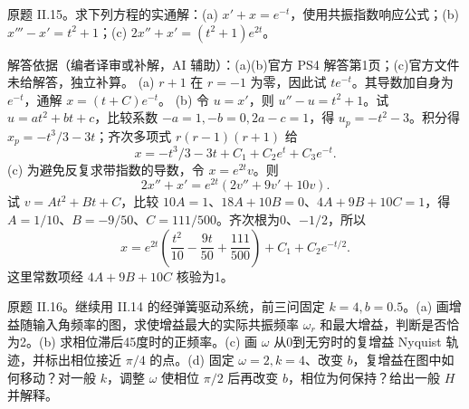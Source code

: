 \begin{exercise}\label{cw:ps4-II-15}
原题 II.15。求下列方程的实通解：(a) $x'+x=e^{-t}$，使用共振指数响应公式；(b) $x'''-x'=t^2+1$；(c) $2x''+x'=(t^2+1)e^{2t}$。
\end{exercise}
\begin{solution}
解答依据（编者译审或补解，AI 辅助）：(a)(b)官方 PS4 解答第1页；(c)官方文件未给解答，独立补算。
(a) $r+1$ 在 $r=-1$ 为零，因此试 $te^{-t}$。其导数加自身为 $e^{-t}$，通解 $x=(t+C)e^{-t}$。
(b) 令 $u=x'$，则 $u''-u=t^2+1$。试 $u=at^2+bt+c$，比较系数 $-a=1,-b=0,2a-c=1$，得 $u_p=-t^2-3$。积分得 $x_p=-t^3/3-3t$；齐次多项式 $r(r-1)(r+1)$ 给
\[
 x=-t^3/3-3t+C_1+C_2e^t+C_3e^{-t}.
\]
(c) 为避免反复求带指数的导数，令 $x=e^{2t}v$。则
\[
 2x''+x'=e^{2t}(2v''+9v'+10v).
\]
试 $v=At^2+Bt+C$，比较 $10A=1$、$18A+10B=0$、$4A+9B+10C=1$，得 $A=1/10$、$B=-9/50$、$C=111/500$。齐次根为0、$-1/2$，所以
\[
 x=e^{2t}\left(\frac{t^2}{10}-\frac{9t}{50}+\frac{111}{500}\right)
 +C_1+C_2e^{-t/2}.
\]
这里常数项经 $4A+9B+10C$ 核验为1。
\end{solution}
\begin{exercise}\label{cw:ps4-II-16}
原题 II.16。继续用 II.14 的经弹簧驱动系统，前三问固定 $k=4,b=0.5$。(a) 画增益随输入角频率的图，求使增益最大的实际共振频率 $\omega_r$ 和最大增益，判断是否恰为2。(b) 求相位滞后45度时的正频率。(c) 画 $\omega$ 从0到无穷时的复增益 Nyquist 轨迹，并标出相位接近 $\pi/4$ 的点。(d) 固定 $\omega=2,k=4$、改变 $b$，复增益在图中如何移动？对一般 $k$，调整 $\omega$ 使相位 $\pi/2$ 后再改变 $b$，相位为何保持？给出一般 $H$ 并解释。
\end{exercise}
